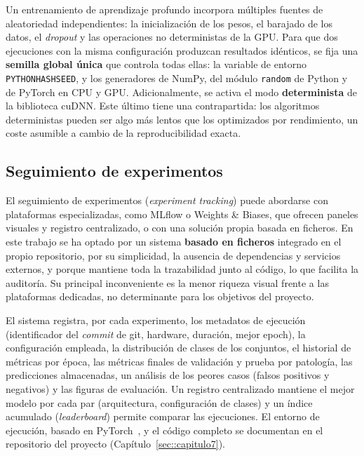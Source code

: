 Un entrenamiento de aprendizaje profundo incorpora múltiples fuentes de
aleatoriedad independientes: la inicialización de los pesos, el barajado de los
datos, el \textit{dropout} y las operaciones no deterministas de la GPU. Para que
dos ejecuciones con la misma configuración produzcan resultados idénticos, se fija
una \textbf{semilla global única} que controla todas ellas: la variable de entorno
\texttt{PYTHONHASHSEED}, y los generadores de NumPy, del módulo \texttt{random} de
Python y de PyTorch en CPU y GPU. Adicionalmente, se activa el modo
\textbf{determinista} de la biblioteca cuDNN. Este último tiene una contrapartida:
los algoritmos deterministas pueden ser algo más lentos que los optimizados por
rendimiento, un coste asumible a cambio de la reproducibilidad exacta.

\subsection{Seguimiento de experimentos}

El seguimiento de experimentos (\textit{experiment tracking}) puede abordarse con
plataformas especializadas, como MLflow o Weights \& Biases, que ofrecen paneles
visuales y registro centralizado, o con una solución propia basada en ficheros.
En este trabajo se ha optado por un sistema \textbf{basado en ficheros}
integrado en el propio repositorio, por su simplicidad, la ausencia de
dependencias y servicios externos, y porque mantiene toda la trazabilidad junto al
código, lo que facilita la auditoría. Su principal inconveniente es la menor
riqueza visual frente a las plataformas dedicadas, no determinante para los
objetivos del proyecto.

El sistema registra, por cada experimento, los metadatos de ejecución
(identificador del \textit{commit} de git, hardware, duración, mejor epoch), la
configuración empleada, la distribución de clases de los conjuntos, el historial
de métricas por época, las métricas finales de validación y prueba por patología,
las predicciones almacenadas, un análisis de los peores casos (falsos positivos y
negativos) y las figuras de evaluación. Un registro centralizado mantiene el mejor
modelo por cada par (arquitectura, configuración de clases) y un índice acumulado
(\textit{leaderboard}) permite comparar las ejecuciones. El entorno de ejecución,
basado en PyTorch~\cite{paszkePyTorch2019}, y el código completo se documentan en
el repositorio del proyecto (Capítulo~\ref{sec::capitulo7}).
